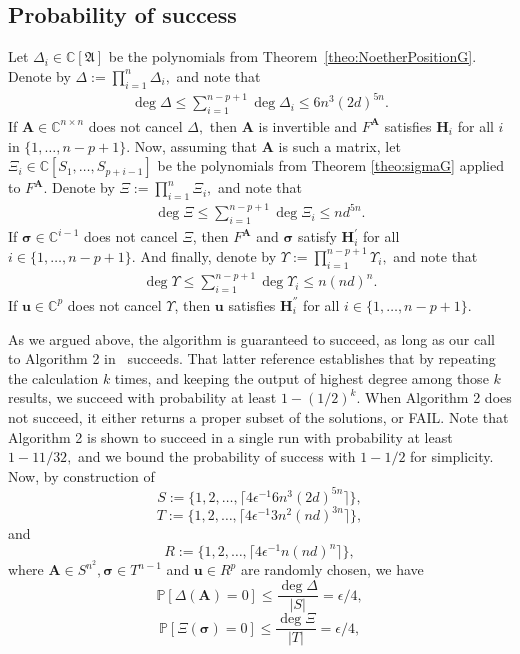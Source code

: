 \documentclass[12pt]{article}
\def\A{\mathfrak{A}}
\def\mA{{\bm A}}
\def\ub{{\bm u}}
\def\D{\Delta}
\def\C{\mathbb{C}}
\def\pr{\mathbb{P}}
\begin{document}
\subsection{Probability of success} 
Let $\Delta_i \in \C[\A]$ be the polynomials from
Theorem~\ref{theo:NoetherPositionG}. Denote by $\Delta := \prod_{i=1}^n \D_i,$ and
note that
\begin{align}
    \deg \Delta \leq \sum_{i=1}^{n-p+1} \deg \Delta_i \leq 6n^3(2d)^{5n}.
\end{align}
If $\mA \in \C^{n \times n}$ does not cancel $\Delta,$ then $\mA$ is
invertible and $F^\mA$ satisfies $\bm H_i$ for all $i$ in
$\{1,\hdots,n-p+1\}.$ Now, assuming that $\mA$ is such a matrix, let
$\Xi_i\in \C[S_1,\dots,S_{p+i-1}]$ be the polynomials from Theorem \ref{theo:sigmaG} applied to
$F^{\mA}.$ Denote by $\Xi := \prod_{i=1}^n \Xi_i,$ and note that
\begin{align}
    \deg \Xi \leq \sum_{i=1}^{n-p+1} \deg \Xi_i \leq nd^{5n}.
\end{align}
If $\bm \sigma \in \C^{i-1}$ does not cancel $\Xi$, then $F^{\mA}$ and
$\bm \sigma$ satisfy $\bm H_i^{'}$ for all $i \in
\{1,\hdots,n-p+1\}.$ And finally, denote by $\Upsilon := \prod_{i=1}^{n-p+1} \Upsilon_i,$ and
note that
\begin{align}
    \deg \Upsilon \leq \sum_{i=1}^{n-p+1} \deg \Upsilon_i \leq n(nd)^n.
\end{align}
If $\ub \in \C^{p}$ does not cancel $\Upsilon$, then $\ub$ satisfies $\bm H_i^{''}$ for all $i \in
\{1,\hdots,n-p+1\}.$
\par 
As we argued above, the algorithm is guaranteed to
succeed, as long as our call to Algorithm 2 in~\cite{SH} succeeds. That latter reference establishes that by repeating the calculation $k$ times, and keeping the output of highest degree among those $k$ results, we succeed with probability at least $1-(1/2)^k$. When Algorithm 2 does not succeed, it either returns a proper subset of the solutions, or FAIL. Note that Algorithm 2 is shown to succeed in a single run with  probability at least $1-11/32,$ and we bound the probability of success with $1-1/2$ for simplicity. 
Now, by construction of
\[
S := \{1,2,\hdots,\lceil 4\epsilon^{-1}6n^3(2d)^{5n}\rceil \},
\] 
\[
T := \{1,2,\hdots,\lceil 4\epsilon^{-1}3n^2(nd)^{3n} \rceil \},
\] 
and 
\[
R := \{1,2,\hdots,\lceil 4\epsilon^{-1}n(nd)^n \rceil \},
\]
where $\mA \in S^{n^2}, \bm \sigma \in T^{n-1}$ and $\ub \in R^{p}$ are randomly chosen, we have 
%
\[
\pr[\Delta(\mA)=0] \leq  \frac{\deg\Delta}{|S|} = \epsilon/4,
\]
\[
\pr[\Xi(\bm \sigma)=0] \leq  \frac{\deg\Xi}{|T|} = \epsilon/4,
\]
\end{document}
